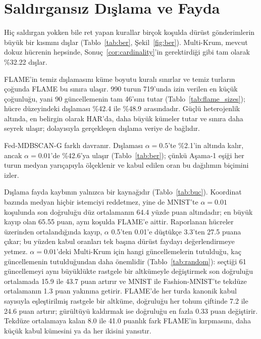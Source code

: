 \documentclass[journal]{IEEEtran}
\newcommand{\method}{Fed-MDBSCAN-G}
\begin{document}
\section{Saldırgansız Dışlama ve Fayda}\label{sec:benign}





Hiç saldırgan yokken bile ret yapan kurallar birçok koşulda dürüst gönderimlerin büyük bir kısmını dışlar (Tablo~\ref{tab:ber}, Şekil~\ref{fig:ber}). Multi-Krum, mevcut dokuz hücrenin hepsinde, Sonuç~\ref{cor:cardinality}'in gerektirdiği gibi tam olarak \%32.22 dışlar.

FLAME'in temiz dışlamasını küme boyutu kuralı sınırlar ve temiz turların çoğunda FLAME bu sınıra ulaşır. 990 turun 719'unda izin verilen en küçük çoğunluğu, yani 90 güncellemenin tam 46'sını tutar (Tablo~\ref{tab:flame_sizes}); hücre düzeyindeki dışlaması \%42.4 ile \%48.9 arasındadır. Güçlü heterojenlik altında, en belirgin olarak HAR'da, daha büyük kümeler tutar ve sınıra daha seyrek ulaşır; dolayısıyla gerçekleşen dışlama veriye de bağlıdır.

\method{} farklı davranır. Dışlaması $\alpha=0.5$'te \%2.1'in altında kalır, ancak $\alpha=0.01$'de \%42.6'ya ulaşır (Tablo~\ref{tab:ber}); çünkü Aşama-1 eşiği her turun medyan yarıçapıyla ölçeklenir ve kabul edilen oran bu dağılımın biçimini izler.

Dışlama fayda kaybının yalnızca bir kaynağıdır (Tablo~\ref{tab:buc}). Koordinat bazında medyan hiçbir istemciyi reddetmez, yine de MNIST'te $\alpha=0.01$ koşulunda son doğruluğu düz ortalamanın 64.4 yüzde puan altındadır; en büyük kayıp olan 65.55 puan, aynı koşulda FLAME'e aittir. Raporlanan hücreler üzerinden ortalandığında kayıp, $\alpha$ 0.5'ten 0.01'e düştükçe 3.3'ten 27.5 puana çıkar; bu yüzden kabul oranları tek başına dürüst faydayı değerlendirmeye yetmez. $\alpha=0.01$'deki Multi-Krum için hangi güncellemelerin tutulduğu, kaç güncellemenin tutulduğundan daha önemlidir (Tablo~\ref{tab:random}): seçtiği 61 güncellemeyi aynı büyüklükte rastgele bir altkümeyle değiştirmek son doğruluğu ortalamada 15.9 ile 43.7 puan artırır ve MNIST ile Fashion-MNIST'te tekdüze ortalamanın 1.3 puan yakınına getirir. FLAME'de her turda kanonik kabul sayısıyla eşleştirilmiş rastgele bir altküme, doğruluğu her tohum çiftinde 7.2 ile 24.6 puan artırır; gürültüyü kaldırmak ise doğruluğu en fazla 0.33 puan değiştirir. Tekdüze ortalamaya kalan 8.0 ile 41.0 puanlık fark FLAME'in kırpmasını, daha küçük kabul kümesini ya da her ikisini yansıtır.
\end{document}

